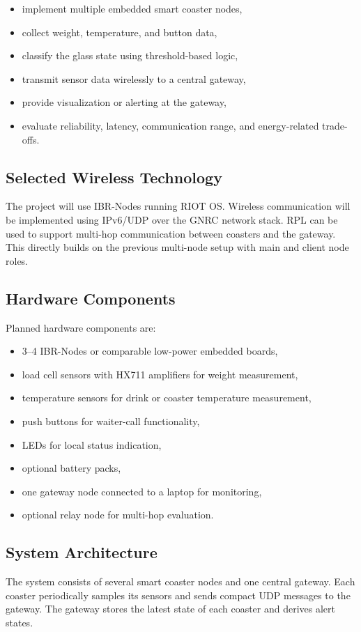 \documentclass[11pt,a4paper]{article}
\newcommand{\projecttitle}[1]{\subsection*{#1}}
\begin{document}
\begin{itemize}
    \item implement multiple embedded smart coaster nodes,
    \item collect weight, temperature, and button data,
    \item classify the glass state using threshold-based logic,
    \item transmit sensor data wirelessly to a central gateway,
    \item provide visualization or alerting at the gateway,
    \item evaluate reliability, latency, communication range, and energy-related trade-offs.
\end{itemize}

\projecttitle{Selected Wireless Technology}

The project will use IBR-Nodes running RIOT OS. Wireless communication will be implemented using IPv6/UDP over the GNRC network stack. RPL can be used to support multi-hop communication between coasters and the gateway. This directly builds on the previous multi-node setup with main and client node roles.

\projecttitle{Hardware Components}

Planned hardware components are:

\begin{itemize}
    \item 3--4 IBR-Nodes or comparable low-power embedded boards,
    \item load cell sensors with HX711 amplifiers for weight measurement,
    \item temperature sensors for drink or coaster temperature measurement,
    \item push buttons for waiter-call functionality,
    \item LEDs for local status indication,
    \item optional battery packs,
    \item one gateway node connected to a laptop for monitoring,
    \item optional relay node for multi-hop evaluation.
\end{itemize}

\projecttitle{System Architecture}

The system consists of several smart coaster nodes and one central gateway. Each coaster periodically samples its sensors and sends compact UDP messages to the gateway. The gateway stores the latest state of each coaster and derives alert states.
\end{document}
